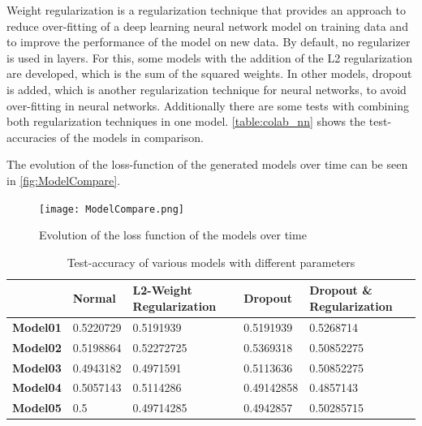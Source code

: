 Weight regularization is a regularization technique that provides an approach to reduce over-fitting of a deep learning neural network model on training data and to improve the performance of the model on new data.\newline
By default, no regularizer is used in layers. For this, some models with the addition of the L2 regularization are developed, which is the sum of the squared weights.\newline \newline
In other models, dropout is added, which is another regularization technique for neural networks, to avoid over-fitting in neural networks. Additionally there are some tests with combining both regularization techniques in one model. \autoref{table:colab_nn} shows the test-accuracies of the models in comparison.

The evolution of the loss-function of the generated models over time can be seen in \autoref{fig:ModelCompare}.

\begin{figure}[H]
\begin{center}
\texttt{[image: ModelCompare.png]}
\end{center}
\caption{Evolution of the loss function of the models over time}
\label{fig:ModelCompare}
\end{figure}

\begin{table}
\centering
\begin{tabular}{|p{2cm}|p{2cm}|p{3cm}|p{2cm}|p{3cm}|}
\hline
 & \textbf{Normal} & \textbf{L2-Weight \newline Regularization} & \textbf{Dropout} & \textbf{Dropout \& \newline Regularization} \\ \hline
\textbf{Model01} & 0.5220729 & 0.5191939 & 0.5191939 & 0.5268714 \\ \hline
\textbf{Model02} & 0.5198864 & 0.52272725 & 0.5369318 & 0.50852275 \\ \hline
\textbf{Model03} & 0.4943182 & 0.4971591 & 0.5113636 & 0.50852275 \\ \hline
\textbf{Model04} & 0.5057143 & 0.5114286 & 0.49142858 & 0.4857143 \\ \hline
\textbf{Model05} & 0.5 & 0.49714285 & 0.4942857 & 0.50285715 \\ \hline

\end{tabular}
\caption{Test-accuracy of various models with different parameters}
\label{table:colab_nn}
\end{table}

